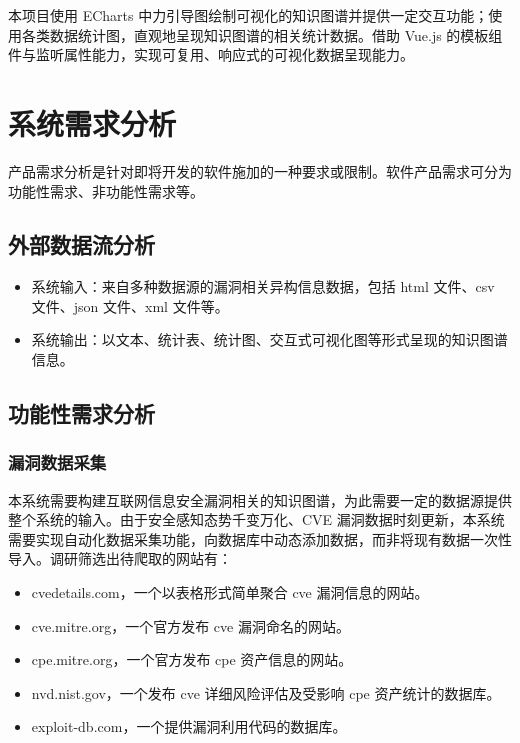 \documentclass[a4paper,AutoFakeBold,oneside,12pt]{book}
\begin{document}
本项目使用 ECharts 中力引导图绘制可视化的知识图谱并提供一定交互功能；使用各类数据统计图，直观地呈现知识图谱的相关统计数据。借助 Vue.js 的模板组件与监听属性能力，实现可复用、响应式的可视化数据呈现能力。

\chapter{系统需求分析}

产品需求分析是针对即将开发的软件施加的一种要求或限制。软件产品需求可分为功能性需求、非功能性需求等。\cite{bourque_guide_2014}

\section{外部数据流分析}

\begin{itemize}
	\item 系统输入：来自多种数据源的漏洞相关异构信息数据，包括 html 文件、csv 文件、json 文件、xml 文件等。
	\item 系统输出：以文本、统计表、统计图、交互式可视化图等形式呈现的知识图谱信息。
\end{itemize}

\section{功能性需求分析}

\subsection{漏洞数据采集}

本系统需要构建互联网信息安全漏洞相关的知识图谱，为此需要一定的数据源提供整个系统的输入。由于安全感知态势千变万化、CVE 漏洞数据时刻更新，本系统需要实现自动化数据采集功能，向数据库中动态添加数据，而非将现有数据一次性导入。调研筛选出待爬取的网站有：
\begin{itemize}
	\item cvedetails.com，一个以表格形式简单聚合 cve 漏洞信息的网站。
	\item cve.mitre.org，一个官方发布 cve 漏洞命名的网站。
	\item cpe.mitre.org，一个官方发布 cpe 资产信息的网站。
	\item nvd.nist.gov，一个发布 cve 详细风险评估及受影响 cpe 资产统计的数据库。
	\item exploit-db.com，一个提供漏洞利用代码的数据库。
\end{itemize}
\end{document}
